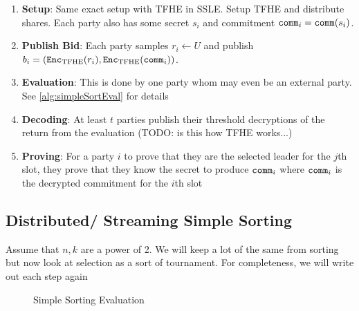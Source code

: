 \documentclass[11pt]{article}
\begin{document}
\begin{enumerate}
  \item \textbf{Setup}: Same exact setup with TFHE in SSLE. Setup TFHE and distribute shares.
  Each party also has some secret $s_i$ and commitment $\texttt{comm}_i = \texttt{comm}(s_i)$.
  \item \textbf{Publish Bid}: Each party samples $r_i \leftarrow U$ and publish $b_i = (\texttt{Enc}_{\mathrm{TFHE}}(r_i), \texttt{Enc}_{\mathrm{TFHE}}(\texttt{comm}_i))$.
  \item \textbf{Evaluation}: This is done by one party whom may even be an external party. See \cref{alg:simpleSortEval} for details
  \item \textbf{Decoding}: At least $t$ parties publish their threshold decryptions of the return from the evaluation (TODO: is this how TFHE works...)
  \item \textbf{Proving}: For a party $i$ to prove that they are the selected leader for the $j$th slot, they prove that they know the secret to produce $\texttt{comm}_i$
  where $\texttt{comm}_i$ is the decrypted commitment for the $i$th slot
\end{enumerate}

\subsection{Distributed/ Streaming Simple Sorting}
Assume that $n, k$ are a power of 2. We will keep a lot of the same from sorting
but now look at selection as a sort of tournament. For completeness, we will write out each step again

\algrenewcommand{}
\algrenewcommand{}

\begin{figure}
\begin{center}
\end{center}
\caption{Simple Sorting Evaluation}
\label{alg:distrEval}
\end{figure}
\end{document}
